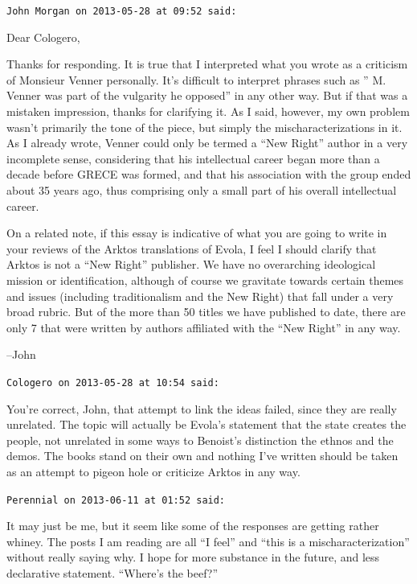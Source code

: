 \begin{footnotesize}
\begin{sffamily}
\hfill

\texttt{John Morgan on 2013-05-28 at 09:52 said:}

Dear Cologero,

Thanks for responding. It is true that I interpreted what you wrote as a criticism of Monsieur Venner personally. It's difficult to interpret phrases such as '' M. Venner was part of the vulgarity he opposed'' in any other way. But if that was a mistaken impression, thanks for clarifying it. As I said, however, my own problem wasn't primarily the tone of the piece, but simply the mischaracterizations in it. As I already wrote, Venner could only be termed a ``New Right'' author in a very incomplete sense, considering that his intellectual career began more than a decade before GRECE was formed, and that his association with the group ended about 35 years ago, thus comprising only a small part of his overall intellectual career.

On a related note, if this essay is indicative of what you are going to write in your reviews of the Arktos translations of Evola, I feel I should clarify that Arktos is not a ``New Right'' publisher. We have no overarching ideological mission or identification, although of course we gravitate towards certain themes and issues (including traditionalism and the New Right) that fall under a very broad rubric. But of the more than 50 titles we have published to date, there are only 7 that were written by authors affiliated with the ``New Right'' in any way.

--John

\hfill

\texttt{Cologero on 2013-05-28 at 10:54 said:}

You're correct, John, that attempt to link the ideas failed, since they are really unrelated. The topic will actually be Evola's statement that the state creates the people, not unrelated in some ways to Benoist's distinction the ethnos and the demos. The books stand on their own and nothing I've written should be taken as an attempt to pigeon hole or criticize Arktos in any way.


\hfill

\texttt{Perennial on 2013-06-11 at 01:52 said:}

It may just be me, but it seem like some of the responses are getting rather whiney. The posts I am reading are all ``I feel'' and ``this is a mischaracterization'' without really saying why. I hope for more substance in the future, and less declarative statement. ``Where's the beef?''


\end{sffamily}
\end{footnotesize}
